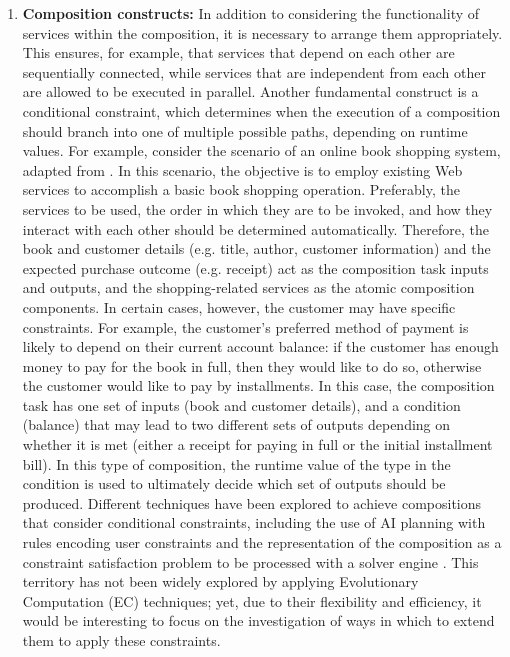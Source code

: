\begin{enumerate}
 
 \item \textbf{Composition constructs:} In addition to considering the functionality of services within the composition, it is necessary to arrange them appropriately. This ensures, for example, that services that depend on each other are sequentially connected, while services that are independent from each other are allowed to be executed in parallel. Another fundamental construct is a conditional constraint, which determines when the execution of a composition should branch into one of multiple possible paths, depending on runtime values. For example, consider the scenario of an online book shopping system, adapted from \cite{wang2014automated}. In this scenario, the objective is to employ existing Web services to accomplish a basic book shopping operation. Preferably, the services to be used, the order in which they are to be invoked, and how they interact with each other should be determined automatically. Therefore, the book and customer details (e.g. title, author, customer information) and the expected purchase outcome (e.g. receipt) act as the composition task inputs and outputs, and the shopping-related services as the atomic composition components. In certain cases, however, the customer may have specific constraints. For example, the customer's preferred method of payment is likely to depend on their current account balance: if the customer has enough money to pay for the book in full, then they would like to do so, otherwise the customer would like to pay by installments. In this case, the composition task has one set of inputs (book and customer details), and a condition (balance) that may lead to two different sets of outputs depending on whether it is met (either a receipt for paying in full or the initial installment bill). In this type of composition, the runtime value of the type in the condition is used to ultimately decide which set of outputs should be produced. Different techniques have been explored to achieve compositions that consider conditional constraints, including the use of AI planning with rules encoding user constraints \cite{DBLP:journals/soca/BoustilMS14} and the representation of the composition as a constraint satisfaction problem to be processed with a solver engine \cite{karakoc2009composing}. This territory has not been widely explored by applying Evolutionary Computation (EC) techniques; yet, due to their flexibility and efficiency, it would be interesting to focus on the investigation of ways in which to extend them to apply these constraints.
 

\end{enumerate}
